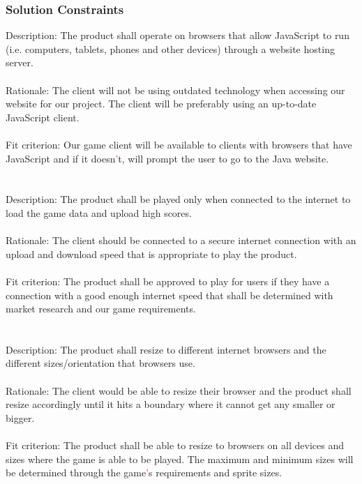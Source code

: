 \documentclass[11pt, oneside]{article}   	%
\begin{document}
\subsubsection{Solution Constraints}
Description: The product shall operate on browsers that allow JavaScript to run (i.e. computers, tablets, phones and other devices) through a website hosting server.
\\
\\
Rationale: The client will not be using outdated technology when accessing our website for our project. The client will be preferably using an up-to-date JavaScript client. 
\\
\\
Fit criterion: Our game client will be available to clients with browsers that have JavaScript and if it doesn\textcolor{red}{'}t, will prompt the user to go to the Java website. 
\\
\\
\\
Description: The product shall be played only when connected to the internet to load the game data and upload high scores. 
\\
\\
Rationale: The client should be connected to a secure internet connection with an upload and download speed that is appropriate to play the product. 
\\
\\
Fit criterion: The product shall be approved to play for users if they have a connection with a good enough internet speed that shall be determined with market research and our game requirements.
\\
\\
\\
Description: The product shall resize to different internet browsers and the different sizes/orientation that browsers use.
\\
\\
Rationale: The client would be able to resize their browser and the product shall resize accordingly until it hits a boundary where it cannot get any smaller or bigger.
\\
\\
Fit criterion: The product shall be able to resize to browsers on all devices and sizes where the game is able to be played. The maximum and minimum sizes will be determined through the game\textcolor{red}{'}s requirements and sprite sizes.
\end{document}
